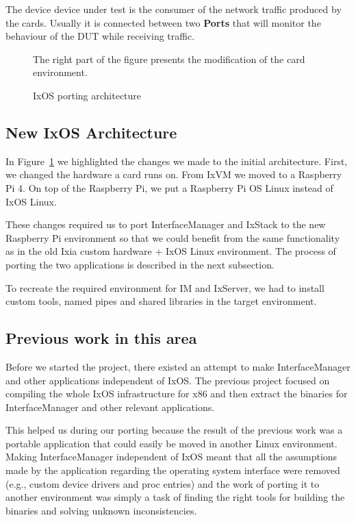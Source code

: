 The device device under test is the consumer of the network traffic produced by
the cards. Usually it is connected between two \textbf{Ports} that will monitor the
behaviour of the DUT while receiving traffic.

\begin{figure}
    \centering
    \def\svgscale{0.95}
    
    \caption{IxOS porting architecture}
    \label{fig:ixos_arch}
    \medskip
    \small
    The right part of the figure presents the modification of the card
    environment.
\end{figure}

\subsection{New IxOS Architecture}

In Figure~\ref{fig:ixos_arch} we highlighted the changes we made to the initial
architecture. First, we changed the hardware a card runs on. From IxVM we moved
to a Raspberry Pi 4. On top of the Raspberry Pi, we put a Raspberry Pi OS Linux
instead of IxOS Linux.

These changes required us to port InterfaceManager and IxStack to the new
Raspberry Pi environment so that we could benefit from the same functionality as in the
old Ixia custom hardware + IxOS Linux environment. The process of porting the
two applications is described in the next subsection.

To recreate the required environment for IM and IxServer, we had to install
custom tools, named pipes and shared libraries in the target environment.

\subsection{Previous work in this area}

Before we started the project, there existed an attempt to make InterfaceManager
and other applications independent of IxOS. The previous project focused on
compiling the whole IxOS infrastructure for x86 and then extract the binaries
for InterfaceManager and other relevant applications.

This helped us during our porting because the result of the previous work was a
portable application that could easily be moved in another Linux environment.
Making InterfaceManager independent of IxOS meant that all the assumptions made
by the application regarding the operating system interface were removed (e.g.,
custom device drivers and proc entries) and the work of porting it to another
environment was simply a task of finding the right tools for building the
binaries and solving unknown inconsistencies.

